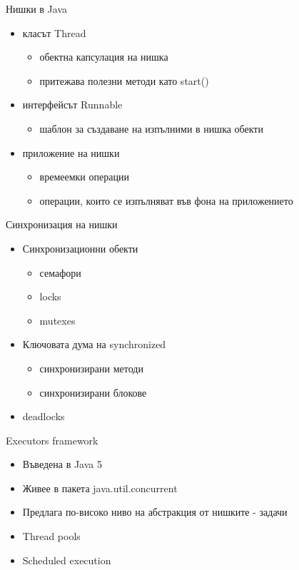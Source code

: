 \documentclass{beamer}
\begin{document}
\begin{frame}{Нишки в Java}
  \transdissolve
  \begin{itemize}
  \item класът Thread
    \begin{itemize}
      \item обектна капсулация на нишка
      \item притежава полезни методи като start()
    \end{itemize}
  \item интерфейсът Runnable
    \begin{itemize}
      \item шаблон за създаване на изпълними в нишка обекти
    \end{itemize}
  \item приложение на нишки
    \begin{itemize}
      \item времеемки операции
      \item операции, които се изпълняват във фона на приложението
    \end{itemize}
  \end{itemize}
\end{frame}

\begin{frame}{Синхронизация на нишки}
  \transdissolve
  \begin{itemize}
  \item Синхронизационни обекти
    \begin{itemize}
      \item семафори
      \item locks
      \item mutexes
    \end{itemize}
    \item Ключовата дума на synchronized
      \begin{itemize}
        \item синхронизирани методи
        \item синхронизирани блокове
      \end{itemize}

    \item deadlocks
  \end{itemize}
\end{frame}

\begin{frame}{Executors framework}
  \transdissolve
  \begin{itemize}
  \item Въведена в Java 5
  \item Живее в пакета java.util.concurrent
  \item Предлага по-високо ниво на абстракция от нишките - задачи
  \item Thread pools
  \item Scheduled execution
  \end{itemize}
\end{frame}
\end{document}
